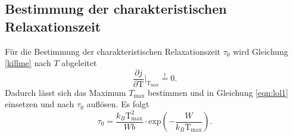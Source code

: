 \subsection{Bestimmung der charakteristischen Relaxationszeit}
Für die Bestimmung der charakteristischen Relaxationszeit $\tau_0$ wird Gleichung \eqref{killme} nach $T$ abgeleitet
\begin{equation}
\frac{\partial j}{\partial \text{T}}\biggr|_{\text{T}_{\text{max}}} \stackrel{!}{=} 0.
\end{equation}
Dadurch lässt sich das Maximum $T_{\text{max}}$ bestimmen und in Gleichung \eqref{eqn:lol1} einsetzen und nach $\tau_0$ auflösen. Es folgt
\begin{equation}
    \label{eqn:hier}
\tau_0 = \frac{k_B \text{T}^2_{\text{max}}}{Wb} \cdot \text{exp} \left( - \frac{W}{k_B \text{T}_{\text{max}}}\right).
\end{equation}







